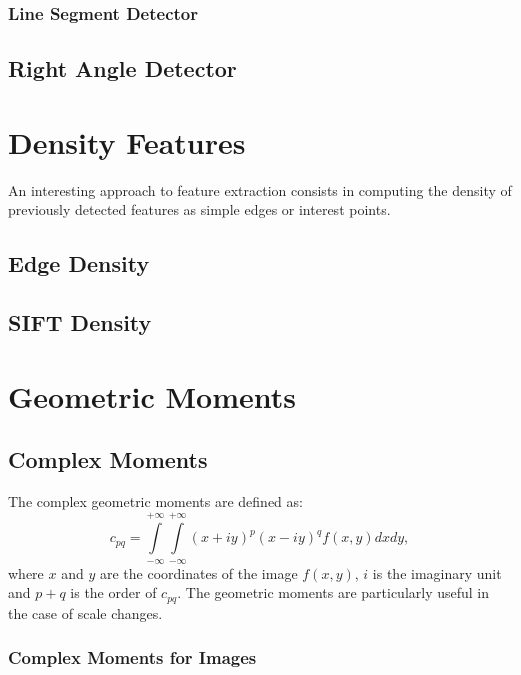 \subsubsection{Line Segment Detector}
\label{sec:LSD}

\subsection{Right Angle Detector}
\label{sec:RightAngleDetector}



\section{Density Features}
An interesting approach to feature extraction consists in computing
the density of previously detected features as simple edges or
interest points.
\subsection{Edge Density}

\subsection{SIFT Density}

% 

\section{Geometric Moments}

\subsection{Complex Moments}
\label{sec:ComplexMoments}
The complex geometric moments are defined as:
\begin {equation}
c_{pq} = \int\limits_{-\infty}^{+\infty}\int\limits_{-\infty}^{+\infty}(x + iy)^p(x- iy)^qf(x,y)dxdy,
\label{2.2}
\end{equation}
where $x$ and $y$ are the coordinates of the image $f(x,y)$, $i$ is the
imaginary unit and
$p+q$ is the order of $c_{pq}$. The geometric moments are
particularly useful in the case of scale changes.

\subsubsection{Complex Moments for Images}

